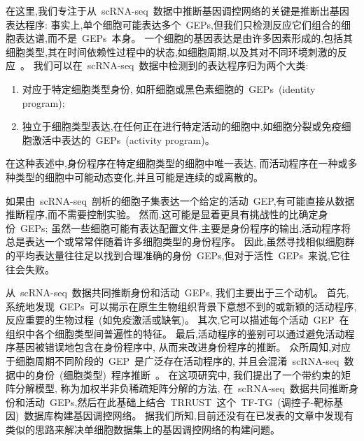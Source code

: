 在这里,我们专注于从~scRNA-seq~数据中推断基因调控网络的关键是推断出基因表达程序:
事实上,单个细胞可能表达多个~GEPs,但我们只检测反应它们组合的细胞表达谱,而不是~GEPs~本身。
一个细胞的基因表达是由许多因素形成的,包括其细胞类型,其在时间依赖性过程中的状态,如细胞周期,以及其对不同环境刺激的反应~\cite{wagner2016revealing}。
我们可以在~scRNA-seq~数据中检测到的表达程序归为两个大类:
\begin{enumerate}
    \item 对应于特定细胞类型身份, 如肝细胞或黑色素细胞的~GEPs~(identity program);
    \item 独立于细胞类型表达,在任何正在进行特定活动的细胞中,如细胞分裂或免疫细胞激活中表达的~GEPs~(activity program)。
\end{enumerate}
在这种表述中,身份程序在特定细胞类型的细胞中唯一表达,
而活动程序在一种或多种类型的细胞中可能动态变化,并且可能是连续的或离散的。

如果由~scRNA-seq~剖析的细胞子集表达一个给定的活动~GEP,有可能直接从数据推断程序,而不需要控制实验。
然而,这可能是显着更具有挑战性的比确定身份~GEPs;
虽然一些细胞可能有表达配置文件,主要是身份程序的输出,活动程序将总是表达一个或常常伴随着许多细胞类型的身份程序。
因此,虽然寻找相似细胞群的平均表达量往往足以找到合理准确的身份~GEPs,但对于活性~GEPs~来说,它往往会失败。

从~scRNA-seq~数据共同推断身份和活动~GEPs, 我们主要出于三个动机。
首先,系统地发现~GEPs~可以揭示在原生生物组织背景下意想不到的或新颖的活动程序,
反应重要的生物过程~(如免疫激活或缺氧)。
其次,它可以描述每个活动~GEP~在组织中各个细胞类型间普遍性的特征。
最后,活动程序的鉴别可以通过避免活动程序基因被错误地包含在身份程序中, 从而来改进身份程序的推断。
众所周知,对应于细胞周期不同阶段的~GEP~是广泛存在活动程序的,
并且会混淆~scRNA-seq~数据中的身份~(细胞类型)~程序推断~\cite{scialdone2015computational,chen2017controlling}。
在这项研究中, 我们提出了一个带约束的矩阵分解模型, 称为加权半非负稀疏矩阵分解的方法,
在~scRNA-seq~数据共同推断身份和活动~GEPs,然后在此基础上结合~TRRUST~这个~TF-TG~(调控子-靶标基因)~数据库构建基因调控网络。
据我们所知,目前还没有在已发表的文章中发现有类似的思路来解决单细胞数据集上的基因调控网络的构建问题。

